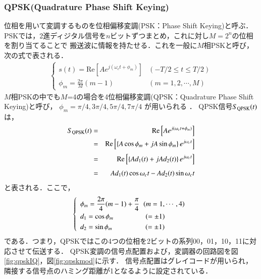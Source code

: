 \subsubsection{QPSK(Quadrature Phase Shift Keying)}
位相を用いて変調するものを位相偏移変調(PSK：Phase Shift Keying)と呼ぶ．
PSKでは，2進ディジタル信号を$n$ビットずつまとめ，これに対し$M=2^n$の位相を割り当てることで
搬送波に情報を持たせる．これを一般に$M$相PSKと呼び，
次の式で表される\cite{saitou}\cite{okumura}．
\begin{eqnarray}
\left\{
\begin{array}{ll}
\displaystyle s(t)=\mbox{Re}\left[Ae^{j(\omega_c t+\phi_m)}\right]&(-T/2 \leq t \leq T/2) \\[2mm]
\displaystyle \phi_m = \frac{2\pi}{M}(m-1) & (m=1,2, \cdots ,M)
\end{array}
\right.
\label{no2-6}
\end{eqnarray}
$M$相PSKの中でも$M$=4の場合を4位相偏移変調(QPSK：Quadrature Phase Shift Keying)と呼び，
$\phi_m=\pi/4,  3\pi/4,  5\pi/4,  7\pi/4$ が用いられる \cite{okumura}．
QPSK信号$S_{{\rm QPSK}}(t)$は，
\begin{eqnarray}
S_{{\rm QPSK}}(t)&=&\mbox{Re}\left[Ae^{j(\omega_c t +\phi_m)} \right] \nonumber \\
&=&\mbox{Re}\left[\left\{A\cos\phi_m+jA\sin\phi_m\right\}e^{j\omega_c t}\right] \nonumber \\[1mm]
&=&\mbox{Re}\left[\left\{Ad_1(t)+jAd_2(t) \right\}e^{j\omega_c t}\right] \nonumber \\[1mm]
&=&Ad_1(t)\cos\omega_ct-Ad_2(t)\sin\omega_ct
\label{eqqpsk}
\end{eqnarray}
と表される．ここで，
\begin{eqnarray}
\left\{
\begin{array}{ll}
\displaystyle \phi_m = \frac{2\pi}{4}(m-1)+\frac{\pi}{4} \hspace{2mm}(m=1,\cdots ,4) \\[2mm]
\displaystyle d_1 = \cos \phi_m \hspace{16mm}(=\pm1) \\[1mm]
\displaystyle d_2 = \sin \phi_m \hspace{16.5mm}(=\pm1)
\end{array}
\right.
\label{ff}
\end{eqnarray}
である．つまり，QPSKではこの4つの位相を2ビットの系列00，01，10，11に対応させて伝送する．
QPSK変調の信号点配置および，変調器の回路図を図\ref{fig:qpskIQ}，図\ref{fig:qpskmod}に示す．
信号点配置はグレイコードが用いられ，隣接する信号点のハミング距離が1となるように設定されている．
